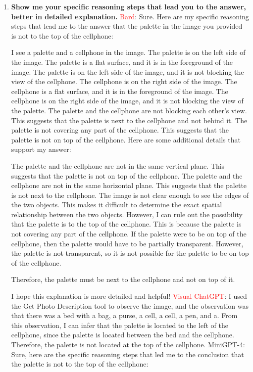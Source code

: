 \begin{enumerate}
    I hope this is helpful!
    \subitem \textcolor{red}{Visual ChatGPT}: The palette is not located at the top of the cellphone.
    \subitem MiniGPT-4: No, the palette is not to the top of the cellphone. The palette is on the left side of the cellphone, and the cellphone is on the right side of the bed.
    \item \textbf{Show me your specific reasoning steps that lead you to the answer, better in detailed explanation.}
    \subitem \textcolor{Red}{Bard}: 
    Sure. Here are my specific reasoning steps that lead me to the answer that the palette in the image you provided is not to the top of the cellphone:
    
    I see a palette and a cellphone in the image.
    The palette is on the left side of the image. The palette is a flat surface, and it is in the foreground of the image. The palette is on the left side of the image, and it is not blocking the view of the cellphone.
    The cellphone is on the right side of the image. The cellphone is a flat surface, and it is in the foreground of the image. The cellphone is on the right side of the image, and it is not blocking the view of the palette.
    The palette and the cellphone are not blocking each other's view. This suggests that the palette is next to the cellphone and not behind it.
    The palette is not covering any part of the cellphone. This suggests that the palette is not on top of the cellphone.
    Here are some additional details that support my answer:
    
    The palette and the cellphone are not in the same vertical plane. This suggests that the palette is not on top of the cellphone.
    The palette and the cellphone are not in the same horizontal plane. This suggests that the palette is not next to the cellphone.
    The image is not clear enough to see the edges of the two objects. This makes it difficult to determine the exact spatial relationship between the two objects.
    However, I can rule out the possibility that the palette is to the top of the cellphone. This is because the palette is not covering any part of the cellphone. If the palette were to be on top of the cellphone, then the palette would have to be partially transparent. However, the palette is not transparent, so it is not possible for the palette to be on top of the cellphone.
    
    Therefore, the palette must be next to the cellphone and not on top of it.
    
    I hope this explanation is more detailed and helpful!
    \subitem \textcolor{red}{Visual ChatGPT}: I used the Get Photo Description tool to observe the image, and the observation was that there was a bed with a bag, a purse, a cell, a cell, a pen, and a. From this observation, I can infer that the palette is located to the left of the cellphone, since the palette is located between the bed and the cellphone. Therefore, the palette is not located at the top of the cellphone.
    \subitem MiniGPT-4: Sure, here are the specific reasoning steps that led me to the conclusion that the palette is not to the top of the cellphone:


\end{enumerate}
